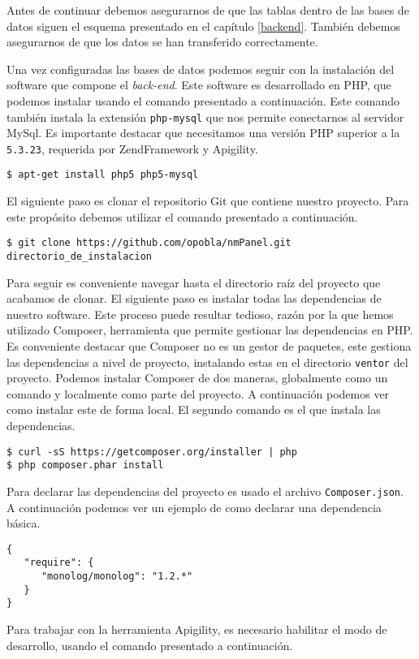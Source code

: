 	Antes de continuar debemos asegurarnos de que las tablas dentro de las bases de datos siguen el esquema presentado en el capítulo
	\ref{backend}. También debemos asegurarnos de que los datos se han transferido correctamente.
	\par
	Una vez configuradas las bases de datos podemos seguir con la instalación del software que compone el \emph{back-end}. Este software es
	desarrollado en PHP, que podemos instalar usando el comando presentado a continuación. Este comando también instala la extensión
	\texttt{php-mysql} que nos permite conectarnos al servidor MySql. Es importante destacar que necesitamos una versión PHP superior a la
	\texttt{5.3.23}, requerida por ZendFramework y Apigility.
	\begin{lstlisting}[style=myBash]
$ apt-get install php5 php5-mysql
	\end{lstlisting}
	El siguiente paso es clonar el repositorio Git que contiene nuestro proyecto. Para este propósito debemos utilizar el comando presentado a
	continuación.
	\begin{lstlisting}[style=myBash]
$ git clone https://github.com/opobla/nmPanel.git directorio_de_instalacion
	\end{lstlisting}
	Para seguir es conveniente navegar hasta el directorio raíz del proyecto que acabamos de clonar. El siguiente paso es instalar todas las
	dependencias de nuestro software. Este proceso puede resultar tedioso, razón por la que hemos utilizado Composer, herramienta que permite
	gestionar las dependencias en PHP. Es conveniente destacar que Composer no es un gestor de paquetes, este gestiona las dependencias a nivel de
	proyecto, instalando estas en el directorio \texttt{ventor} del proyecto. Podemos instalar Composer de dos maneras, globalmente como un
	comando y localmente como parte del proyecto. A continuación podemos ver como instalar este de forma local. El segundo comando es el que
	instala las dependencias. 
	\begin{lstlisting}[style=myBash]
$ curl -sS https://getcomposer.org/installer | php
$ php composer.phar install
	\end{lstlisting}
	Para declarar las dependencias del proyecto es usado el archivo \texttt{Composer.json}. A continuación podemos ver un ejemplo de como declarar
	una dependencia básica. 
	\begin{lstlisting}[style=myFile]
{
   "require": {
      "monolog/monolog": "1.2.*"
   }
}
	\end{lstlisting}
	Para trabajar con la herramienta Apigility, es necesario habilitar el modo de desarrollo, usando el comando presentado a continuación. 
